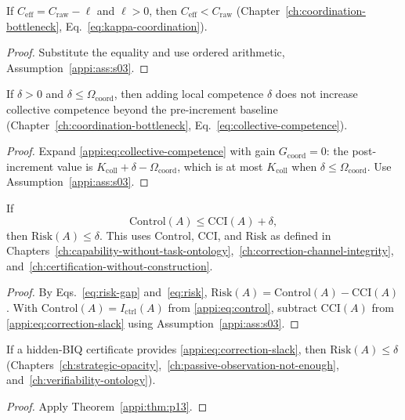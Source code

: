 \begin{lemma}
\label{appi:lem:p12}
If \(C_{\mathrm{eff}}=C_{\mathrm{raw}}-\ell\) and \(\ell>0\), then \(C_{\mathrm{eff}}<C_{\mathrm{raw}}\) (Chapter~\ref{ch:coordination-bottleneck}, Eq.~\eqref{eq:kappa-coordination}).
\end{lemma}
\begin{proof}
Substitute the equality and use ordered arithmetic, Assumption~\ref{appi:ass:s03}.
\end{proof}

\begin{lemma}
\label{appi:lem:p12-coll}
If \(\delta>0\) and \(\delta\leq \Omega_{\mathrm{coord}}\), then adding local competence \(\delta\) does not increase collective competence beyond the pre-increment baseline (Chapter~\ref{ch:coordination-bottleneck}, Eq.~\eqref{eq:collective-competence}).
\end{lemma}
\begin{proof}
Expand \eqref{appi:eq:collective-competence} with gain \(G_{\mathrm{coord}}=0\): the post-increment value is \(K_{\mathrm{coll}}+\delta-\Omega_{\mathrm{coord}}\), which is at most \(K_{\mathrm{coll}}\) when \(\delta\leq \Omega_{\mathrm{coord}}\). Use Assumption~\ref{appi:ass:s03}.
\end{proof}

\begin{theorem}
\label{appi:thm:p13}
If
\begin{equation}
\label{appi:eq:correction-slack}
\mathrm{Control}(A)\leq \mathrm{CCI}(A)+\delta,
\end{equation}
then \(\mathrm{Risk}(A)\leq\delta\).
This uses \(\mathrm{Control}\), \(\mathrm{CCI}\), and \(\mathrm{Risk}\) as defined in Chapters~\ref{ch:capability-without-task-ontology},~\ref{ch:correction-channel-integrity}, and~\ref{ch:certification-without-construction}.
\end{theorem}
\begin{proof}
By Eqs.~\eqref{eq:risk-gap} and~\eqref{eq:risk}, \(\mathrm{Risk}(A)=\mathrm{Control}(A)-\mathrm{CCI}(A)\).
With \(\mathrm{Control}(A)=I_{\mathrm{ctrl}}(A)\) from \eqref{appi:eq:control}, subtract \(\mathrm{CCI}(A)\) from \eqref{appi:eq:correction-slack} using Assumption~\ref{appi:ass:s03}.
\end{proof}

\begin{corollary}
\label{appi:cor:p10h}
If a hidden-BIQ certificate provides \eqref{appi:eq:correction-slack}, then \(\mathrm{Risk}(A)\leq\delta\) (Chapters~\ref{ch:strategic-opacity},~\ref{ch:passive-observation-not-enough}, and~\ref{ch:verifiability-ontology}).
\end{corollary}
\begin{proof}
Apply Theorem~\ref{appi:thm:p13}.
\end{proof}


